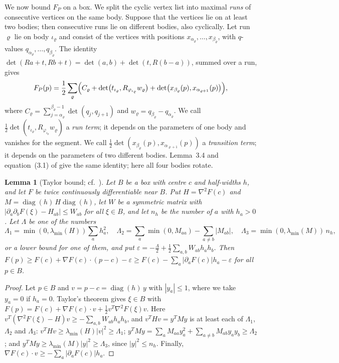 \documentclass[11pt]{amsart}
\newtheorem{lemma}[theorem]{Lemma}
\theoremstyle{definition}
\theoremstyle{remark}
\numberwithin{equation}{section}
\newcommand{\lmin}{\lambda_{\min}}
\begin{document}
We now bound $F_P$ on a box. We split the cyclic vertex list into maximal \emph{runs} of consecutive vertices on the same body. Suppose that the vertices lie on at least two bodies; then consecutive runs lie on different bodies, also cyclically. Let run $\varrho$ lie on body $\iota_\varrho$ and consist of the vertices with positions $x_{\alpha_\varrho},\dots,x_{\beta_\varrho}$, with $q$-values $q_{\alpha_\varrho},\dots,q_{\beta_\varrho}$. The identity $\det(Ra+t,Rb+t)=\det(a,b)+\det(t,R(b-a))$, summed over a run, gives
\begin{equation}\label{eq:runs}
F_P(p)=\frac12\sum_\varrho\Bigl(C_\varrho+\det\bigl(t_{\iota_\varrho},R_{\varphi_{\iota_\varrho}}w_\varrho\bigr)+\det\bigl(x_{\beta_\varrho}(p),x_{\alpha_{\varrho+1}}(p)\bigr)\Bigr),
\end{equation}
where $C_\varrho=\sum_{j=\alpha_\varrho}^{\beta_\varrho-1}\det(q_j,q_{j+1})$ and $w_\varrho=q_{\beta_\varrho}-q_{\alpha_\varrho}$. We call $\frac12\det(t_{\iota_\varrho},R_{\varphi_{\iota_\varrho}}w_\varrho)$ a \emph{run term}; it depends on the parameters of one body and vanishes for the segment. We call $\frac12\det(x_{\beta_\varrho}(p),x_{\alpha_{\varrho+1}}(p))$ a \emph{transition term}; it depends on the parameters of two different bodies. Lemma~3.4 and equation~(3.1) of \cite{Tom26} give the same identity; here all four bodies rotate.

\begin{lemma}[Taylor bound; cf.\ {\cite[Lemma~3.5]{Tom26}}]\label{lem:taylor}
Let $B$ be a box with centre $c$ and half-widths $h$, and let $F$ be twice continuously differentiable near $B$. Put $H=\nabla^2F(c)$ and $M=\operatorname{diag}(h)\,H\operatorname{diag}(h)$, let $W$ be a symmetric matrix with $|\partial_a\partial_bF(\xi)-H_{ab}|\le W_{ab}$ for all $\xi\in B$, and let $n_h$ be the number of $a$ with $h_a>0$. Let $\Lambda$ be one of the numbers
\[
\Lambda_1=\min(0,\lmin(H))\sum_ah_a^2,\quad \Lambda_2=\sum_a\min(0,M_{aa})-\sum_{a\ne b}|M_{ab}|,\quad \Lambda_3=\min(0,\lmin(M))\,n_h,
\]
or a lower bound for one of them, and put $\varepsilon=-\frac\Lambda2+\frac12\sum_{a,b}W_{ab}h_ah_b$. Then $F(p)\ge F(c)+\nabla F(c)\cdot(p-c)-\varepsilon\ge F(c)-\sum_a|\partial_aF(c)|h_a-\varepsilon$ for all $p\in B$.
\end{lemma}

\begin{proof}
Let $p\in B$ and $v=p-c=\operatorname{diag}(h)\,y$ with $|y_a|\le1$, where we take $y_a=0$ if $h_a=0$. Taylor's theorem gives $\xi\in B$ with $F(p)=F(c)+\nabla F(c)\cdot v+\frac12v^T\nabla^2F(\xi)v$. Here $v^T(\nabla^2F(\xi)-H)v\ge-\sum_{a,b}W_{ab}h_ah_b$, and $v^THv=y^TMy$ is at least each of $\Lambda_1$, $\Lambda_2$ and $\Lambda_3$: $v^THv\ge\lmin(H)|v|^2\ge\Lambda_1$; $y^TMy=\sum_aM_{aa}y_a^2+\sum_{a\ne b}M_{ab}y_ay_b\ge\Lambda_2$; and $y^TMy\ge\lmin(M)|y|^2\ge\Lambda_3$, since $|y|^2\le n_h$. Finally, $\nabla F(c)\cdot v\ge-\sum_a|\partial_aF(c)|h_a$.
\end{proof}
\end{document}
